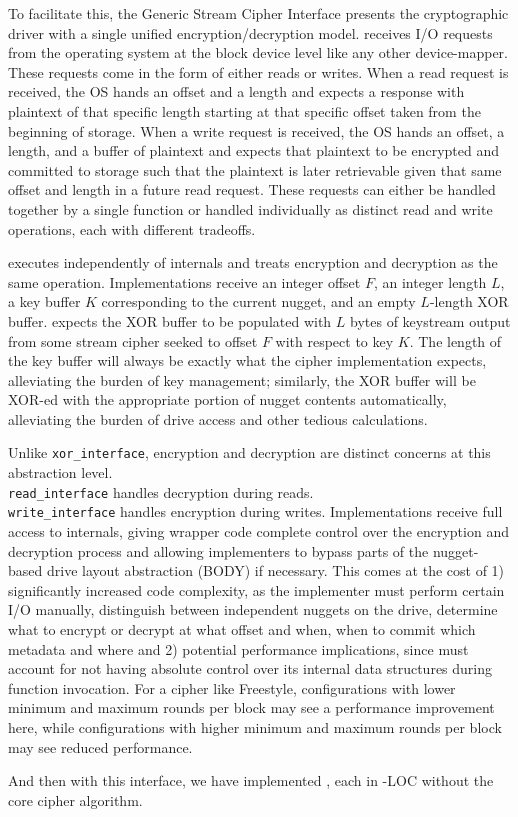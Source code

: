 To facilitate this, the Generic Stream Cipher Interface presents the
cryptographic driver with a single unified encryption/decryption model. \sys
receives I/O requests from the operating system at the block device level like
any other device-mapper. These requests come in the form of either reads or
writes. When a read request is received, the OS hands \sys an offset and a
length and expects a response with plaintext of that specific length starting at
that specific offset taken from the beginning of storage. When a write request
is received, the OS hands \sys an offset, a length, and a buffer of plaintext
and expects that plaintext to be encrypted and committed to storage such that
the plaintext is later retrievable given that same offset and length in a future
read request. These requests can either be handled together by a single function
or handled individually as distinct read and write operations, each with
different tradeoffs.


 executes independently of \sys internals and
treats encryption and decryption as the same operation. Implementations receive
an integer offset $F$, an integer length $L$, a key buffer $K$ corresponding to
the current nugget, and an empty $L$-length XOR buffer. \sys expects the XOR
buffer to be populated with $L$ bytes of keystream output from some stream
cipher seeked to offset $F$ with respect to key $K$. The length of the key
buffer will always be exactly what the cipher implementation expects,
alleviating the burden of key management; similarly, the XOR buffer will be
XOR-ed with the appropriate portion of nugget contents automatically,
alleviating the burden of drive access and other tedious calculations.


 Unlike
\texttt{xor\_interface}, encryption and decryption are distinct concerns at this
abstraction level. \\\texttt{read\_interface} handles decryption during reads.
\\\texttt{write\_interface} handles encryption during writes. Implementations
receive full access to \sys internals, giving wrapper code complete control over
the encryption and decryption process and allowing implementers to bypass parts
of the nugget-based drive layout abstraction (\ie BODY) if necessary. This comes
at the cost of 1) significantly increased code complexity, as the implementer
must perform certain I/O manually, distinguish between independent nuggets on
the drive, determine what to encrypt or decrypt at what offset and when, when to
commit which metadata and where and 2) potential performance implications, since
\sys must account for not having absolute control over its internal data
structures during function invocation. For a cipher like Freestyle,
configurations with lower minimum and maximum rounds per block may see a
performance improvement here, while configurations with higher minimum and
maximum rounds per block may see reduced performance.

And then with this interface, we have implemented , each in \xxx-\xxx LOC without the core cipher
algorithm.




